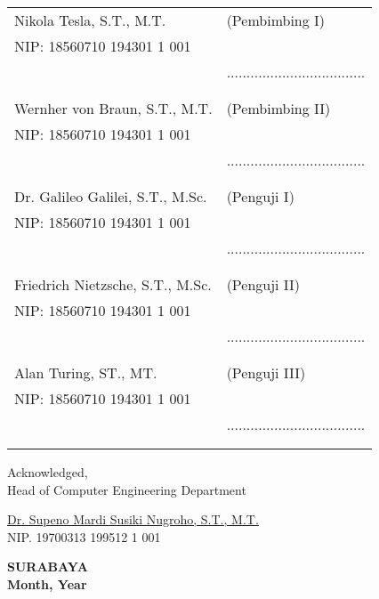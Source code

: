     \noindent
    \begin{tabularx}{\textwidth}{X l}
      Nikola Tesla, S.T., M.T.          & (Pembimbing I) \\
      NIP: 18560710 194301 1 001        & \\
      & ................................... \\
      &  \\
      &  \\
      Wernher von Braun, S.T., M.T.     & (Pembimbing II) \\
      NIP: 18560710 194301 1 001        & \\
      & ................................... \\
      &  \\
      &  \\
      Dr. Galileo Galilei, S.T., M.Sc.  & (Penguji I) \\
      NIP: 18560710 194301 1 001        & \\
      & ................................... \\
      &  \\
      &  \\
      Friedrich Nietzsche, S.T., M.Sc.  & (Penguji II) \\
      NIP: 18560710 194301 1 001        & \\
      & ................................... \\
      &  \\
      &  \\
      Alan Turing, ST., MT.             & (Penguji III) \\
      NIP: 18560710 194301 1 001        & \\
      & ................................... \\
      &  \\
      &  \\
    \end{tabularx}
  \endgroup


  \begin{center}
    Acknowledged, \\
    Head of Computer Engineering Department\\

    \vspace{8ex}

    \underline{Dr. Supeno Mardi Susiki Nugroho, S.T., M.T.} \\
    NIP. 19700313 199512 1 001
  \end{center}

  \begin{center}
    \textbf{SURABAYA\\Month, Year}
  \end{center}
\endgroup
